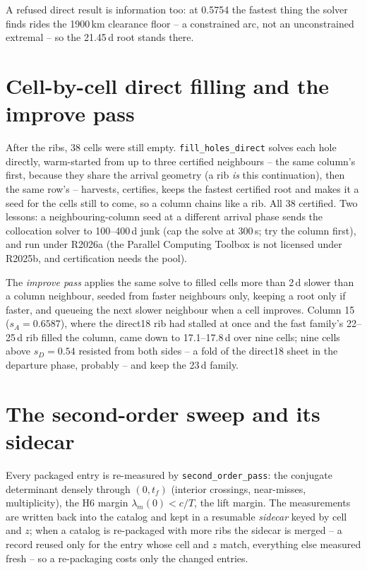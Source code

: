 \documentclass[11pt]{article}
\newcommand{\sD}{s_D}
\newcommand{\sA}{s_A}
\newcommand{\tf}{t_f}
\newcommand{\code}[1]{\texttt{#1}}
\begin{document}
A refused direct result is information too: at 0.5754 the fastest thing
the solver finds rides the 1900\,km clearance floor -- a constrained arc,
not an unconstrained extremal -- so the 21.45\,d root stands there.

\section{Cell-by-cell direct filling and the improve pass}

After the ribs, 38 cells were still empty. \code{fill\_holes\_direct}
solves each hole directly, warm-started from up to three certified
neighbours -- the same column's first, because they share the arrival
geometry (a rib \emph{is} this continuation), then the same row's --
harvests, certifies, keeps the fastest certified root and makes it a seed
for the cells still to come, so a column chains like a rib. All 38
certified. Two lessons: a neighbouring-column seed at a different
arrival phase sends the collocation solver to 100--400\,d junk (cap the
solve at 300\,s; try the column first), and run under R2026a (the
Parallel Computing Toolbox is not licensed under R2025b, and
certification needs the pool).

The \emph{improve pass} applies the same solve to filled cells more than
2\,d slower than a column neighbour, seeded from faster neighbours only,
keeping a root only if faster, and queueing the next slower neighbour
when a cell improves. Column 15 ($\sA=0.6587$), where the direct18 rib had
stalled at once and the fast family's 22--25\,d rib filled the column,
came down to 17.1--17.8\,d over nine cells; nine cells above $\sD=0.54$
resisted from both sides -- a fold of the direct18 sheet in the departure
phase, probably -- and keep the 23\,d family.

\section{The second-order sweep and its sidecar}

Every packaged entry is re-measured by \code{second\_order\_pass}: the
conjugate determinant densely through $(0,\tf)$ (interior crossings,
near-misses, multiplicity), the H6 margin $\lambda_m(0) < c/T$, the lift
margin. The measurements are written back into the catalog and kept in a
resumable \emph{sidecar} keyed by cell and $z$; when a catalog is
re-packaged with more ribs the sidecar is merged -- a record reused only
for the entry whose cell and $z$ match, everything else measured fresh --
so a re-packaging costs only the changed entries.
\end{document}
